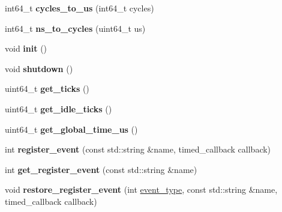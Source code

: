 \begin{DoxyCompactItemize}
int64\+\_\+t {\bfseries cycles\+\_\+to\+\_\+us} (int64\+\_\+t cycles)
\item 
\mbox{\label{classeka2l1_1_1timing__system_aab469fb322d6d3cfb577ddb362bdb7a9}} 
int64\+\_\+t {\bfseries ns\+\_\+to\+\_\+cycles} (uint64\+\_\+t us)
\item 
\mbox{\label{classeka2l1_1_1timing__system_a2b18a6e0b260811725bc323855acf2d7}} 
void {\bfseries init} ()
\item 
\mbox{\label{classeka2l1_1_1timing__system_a1580feef842c44b9f919a9c671a61d49}} 
void {\bfseries shutdown} ()
\item 
\mbox{\label{classeka2l1_1_1timing__system_ae9f0b44d42c17f82e7bd0d4a39a8689b}} 
uint64\+\_\+t {\bfseries get\+\_\+ticks} ()
\item 
\mbox{\label{classeka2l1_1_1timing__system_afa94a35ad801c87caf9b9b5de2ab8ce6}} 
uint64\+\_\+t {\bfseries get\+\_\+idle\+\_\+ticks} ()
\item 
\mbox{\label{classeka2l1_1_1timing__system_a404fa2a682bdbc8ea5694a20f7c1d237}} 
uint64\+\_\+t {\bfseries get\+\_\+global\+\_\+time\+\_\+us} ()
\item 
\mbox{\label{classeka2l1_1_1timing__system_a191e7e84e2284e3880bb447fa876e416}} 
int {\bfseries register\+\_\+event} (const std\+::string \&name, timed\+\_\+callback callback)
\item 
\mbox{\label{classeka2l1_1_1timing__system_a4be003c73be3d45ff72b0704562617fd}} 
int {\bfseries get\+\_\+register\+\_\+event} (const std\+::string \&name)
\item 
\mbox{\label{classeka2l1_1_1timing__system_a6e2ab0b6324c20223ae1c48616575852}} 
void {\bfseries restore\+\_\+register\+\_\+event} (int \mbox{\hyperlink{structeka2l1_1_1event__type}{event\+\_\+type}}, const std\+::string \&name, timed\+\_\+callback callback)
\item 
\mbox{\label{classeka2l1_1_1timing__system_a16794352beb7853f6aae44fcca413117}} 

\end{DoxyCompactItemize}
